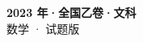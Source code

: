 \documentclass[zihao=-4, a4paper]{ctexart}
\begin{document}
\begin{center}
  {\Large\bfseries 2023 年·全国乙卷·文科}\\[4pt]
  {\large 数学 · 试题版}
\end{center}
\medskip
{}

\end{document}

